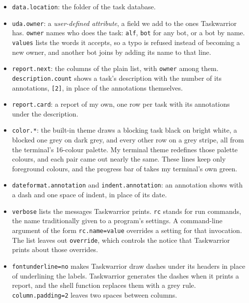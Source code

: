 \documentclass[11pt,a4paper]{article}
\begin{document}
\begin{itemize}[nosep]
  \item \texttt{data.location}: the folder of the task database.
  \item \texttt{uda.owner}: a \emph{user-defined attribute}, a field we add to the ones Taskwarrior has. \texttt{owner} names who does the task: \texttt{alf}, \texttt{bot} for any bot, or a bot by name. \texttt{values} lists the words it accepts, so a typo is refused instead of becoming a new owner, and another bot joins by adding its name to that line.
  \item \texttt{report.next}: the columns of the plain  list, with \texttt{owner} among them. \texttt{description.count} shows a task's description with the number of its annotations, \texttt{[2]}, in place of the annotations themselves.
  \item \texttt{report.card}: a report of my own, one row per task with its annotations under the description.
  \item \texttt{color.*}: the built-in theme draws a blocking task black on bright white, a blocked one grey on dark grey, and every other row on a grey stripe, all from the terminal's 16-colour palette. My terminal theme redefines those palette colours, and each pair came out nearly the same. These lines keep only foreground colours, and the progress bar of  takes my terminal's own green.
  \item \texttt{dateformat.annotation} and \texttt{indent.annotation}: an annotation shows with a dash and one space of indent, in place of its date.
  \item \texttt{verbose} lists the messages Taskwarrior prints. \texttt{rc} stands for run commands, the name traditionally given to a program's settings. A command-line argument of the form \texttt{rc.name=value} overrides a setting for that invocation. The list leaves out \texttt{override}, which controls the notice that Taskwarrior prints about those overrides.   %
  \item \texttt{fontunderline=no} makes Taskwarrior draw dashes under its headers in place of underlining the labels. Taskwarrior generates the dashes when it prints a report, and the shell function replaces them with a grey rule. \texttt{column.padding=2} leaves two spaces between columns. \end{itemize}
\end{document}
